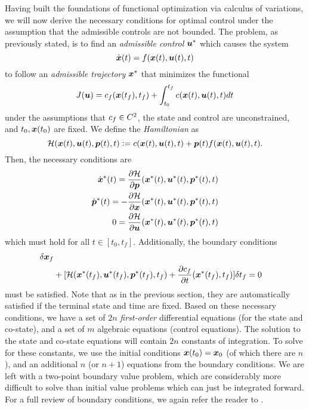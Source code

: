 Having built the foundations of functional optimization via calculus of variations, we will now derive the necessary conditions for optimal control under the assumption that the admissible controls are not bounded. The problem, as previously stated, is to find an \textit{admissible control} $\bm{u}^*$ which causes the system 
\begin{equation}
    \dot{\bm{x}}(t) = f(\bm{x}(t),\bm{u}(t),t)
\end{equation}
to follow an \textit{admissible trajectory} $\bm{x}^*$ that minimizes the functional
\begin{equation}
    J(\bm{u}) = c_f(\bm{x}(t_f),t_f) + \int_{t_0}^{t_f} c(\bm{x}(t),\bm{u}(t),t) dt
\end{equation}
under the assumptions that $c_f \in C^2$, the state and control are unconstrained, and $t_0, \bm{x}(t_0)$ are fixed. We define the \textit{Hamiltonian} as
\begin{equation}
    \mathcal{H}(\bm{x}(t),\bm{u}(t),\bm{p}(t),t) \vcentcolon= c(\bm{x}(t),\bm{u}(t),t) + \bm{p}(t) f(\bm{x}(t),\bm{u}(t),t).
\end{equation}
Then, the necessary conditions are 
\begin{align}
    \dot{\bm{x}}^*(t) = \frac{\partial \mathcal{H}}{\partial \bm{p}}(\bm{x}^*(t),\bm{u}^*(t),\bm{p}^*(t),t)\\
    \dot{\bm{p}}^*(t) = -\frac{\partial \mathcal{H}}{\partial \bm{x}}(\bm{x}^*(t),\bm{u}^*(t),\bm{p}^*(t),t)\\
    0 = \frac{\partial \mathcal{H}}{\partial \bm{u}}(\bm{x}^*(t),\bm{u}^*(t),\bm{p}^*(t),t)
\end{align}
which must hold for all $t \in [t_0,t_f]$. Additionally, the boundary conditions 
\begin{align}
    [\frac{\partial \cost_f}{\partial \st}(\st^*(t_f),t_f)& - \cst^*(t_f)] \delta \st_f\\
    & + [ \ham(\st^*(t_f),\ac^*(t_f), \cst^*(t_f), t_f) + \frac{\partial \cost_f}{\partial t}(\st^*(t_f),t_f)] \delta t_f = 0 \nonumber
\end{align}
must be satisfied. Note that as in the previous section, they are automatically satisfied if the terminal state and time are fixed. Based on these necessary conditions, we have a set of $2n$ \textit{first-order} differential equations (for the state and co-state), and a set of $m$ algebraic equations (control equations). The solution to the state and co-state equations will contain $2n$ constants of integration. To solve for these constants, we use the initial conditions $\bm{x}(t_0) = \bm{x}_0$ (of which there are $n$), and an additional $n$ (or $n+1$) equations from the boundary conditions. We are left with a two-point boundary value problem, which are considerably more difficult to solve than initial value problems which can just be integrated forward. For a full review of boundary conditions, we again refer the reader to \cite{kirk2012optimal}.

